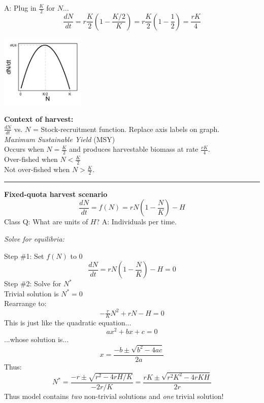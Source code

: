 \documentclass{article}
\newcommand{\note}[1]{\colorbox{gray!30}{#1}}
\newcommand{\ind}{\-\hspace{1cm}}
\begin{document}
\note{A:} Plug in $\frac{K}{2}$ for $N$...
\begin{equation*}
	\frac{dN}{dt}=r\frac{K}{2}\left(1-\frac{K/2}{K}\right)=r\frac{K}{2}\left(1-\frac{1}{2}\right)=\frac{rK}{4}
\end{equation*}
\begin{center}
\includegraphics[width=4cm]{figs/dNdt.jpg}
\end{center}
\textbf{Context of harvest:}\\
$\frac{dN}{dt}$ vs. $N$  = Stock-recruitment function. \note{Replace axis labels on graph.}\\
\emph{Maximum Sustainable Yield} (MSY)\\
\ind Occurs when $N=\frac{K}{2}$ and produces harvestable biomass at rate $\frac{rK}{4}$.\\
\ind Over-fished when $N<\tfrac{K}{2}$\\
\ind Not over-fished when $N>\tfrac{K}{2}$.

\rule[0.5ex]{\linewidth}{1pt}

\textbf{Fixed-quota harvest scenario}
\begin{equation*}
	\frac{dN}{dt}=f(N)=rN\left(1-\frac{N}{K}\right)-H
\end{equation*}
\note{Class Q:} What are units of $H$? \note{A:} Individuals per time.
\vspace{0.5cm}

\emph{Solve for equilibria:}

Step \#1: Set $f(N)$ to $0$
\begin{equation*}
	\frac{dN}{dt}=rN\left(1-\frac{N}{K}\right)-H=0
\end{equation*}
Step \#2: Solve for $N^*$\\
\ind Trivial solution is $N^*=0$\\
\ind Rearrange to:
\begin{equation*}
	-\tfrac{r}{K}N^2+rN-H=0
\end{equation*}
\ind This is just like the quadratic equation...
\begin{equation*}
	ax^2 + bx + c = 0
\end{equation*}
\ind ...whose solution is...
\begin{equation*}
	x=\frac{-b \pm \sqrt{b^2-4ac}}{2a}
\end{equation*}
\ind Thus:
\begin{equation*}
	N^*=\frac{-r \pm \sqrt{r^2 - 4rH/K}}{-2r/K}=\frac{rK \pm \sqrt{r^2 K^2 - 4rKH}}{2r}
\end{equation*}
Thus model contains \emph{two} non-trivial solutions  and \emph{one} trivial solution!\\
\end{document}
